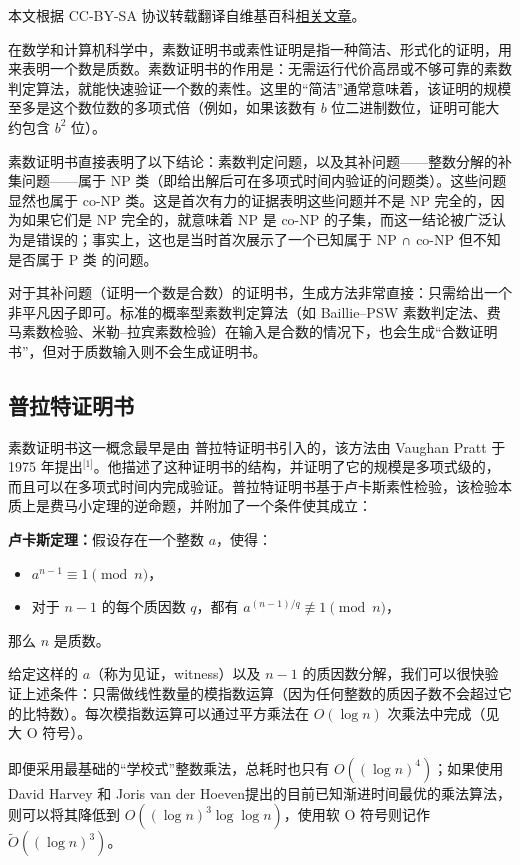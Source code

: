 
本文根据 CC-BY-SA 协议转载翻译自维基百科\href{https://en.wikipedia.org/wiki/Primality_certificate}{相关文章}。

在数学和计算机科学中，素数证明书或素性证明是指一种简洁、形式化的证明，用来表明一个数是质数。素数证明书的作用是：无需运行代价高昂或不够可靠的素数判定算法，就能快速验证一个数的素性。这里的“简洁”通常意味着，该证明的规模至多是这个数位数的多项式倍（例如，如果该数有 $b$ 位二进制数位，证明可能大约包含 $b^2$ 位）。

素数证明书直接表明了以下结论：素数判定问题，以及其补问题——整数分解的补集问题——属于 NP 类（即给出解后可在多项式时间内验证的问题类）。这些问题显然也属于 co-NP 类。这是首次有力的证据表明这些问题并不是 NP 完全的，因为如果它们是 NP 完全的，就意味着 NP 是 co-NP 的子集，而这一结论被广泛认为是错误的；事实上，这也是当时首次展示了一个已知属于 NP ∩ co-NP 但不知是否属于 P 类 的问题。

对于其补问题（证明一个数是合数）的证明书，生成方法非常直接：只需给出一个非平凡因子即可。标准的概率型素数判定算法（如 Baillie–PSW 素数判定法、费马素数检验、米勒–拉宾素数检验）在输入是合数的情况下，也会生成“合数证明书”，但对于质数输入则不会生成证明书。
\subsection{普拉特证明书}
素数证明书这一概念最早是由 普拉特证明书引入的，该方法由 Vaughan Pratt 于 1975 年提出\(^\text{[1]}\)。他描述了这种证明书的结构，并证明了它的规模是多项式级的，而且可以在多项式时间内完成验证。普拉特证明书基于卢卡斯素性检验，该检验本质上是费马小定理的逆命题，并附加了一个条件使其成立：

\textbf{卢卡斯定理：}假设存在一个整数 $a$，使得：
\begin{itemize}
\item $a^{n - 1} \equiv 1 \pmod{n}$，
\item 对于 $n - 1$ 的每个质因数 $q$，都有 $a^{(n - 1) / q} \not\equiv 1 \pmod{n}$，
\end{itemize}
那么 $n$ 是质数。

给定这样的 $a$（称为见证，witness）以及 $n - 1$ 的质因数分解，我们可以很快验证上述条件：只需做线性数量的模指数运算（因为任何整数的质因子数不会超过它的比特数）。每次模指数运算可以通过平方乘法在 $O(\log n)$ 次乘法中完成（见大 O 符号）。

即便采用最基础的“学校式”整数乘法，总耗时也只有 $O((\log n)^{4})$；如果使用 David Harvey 和 Joris van der Hoeven提出的目前已知渐进时间最优的乘法算法，则可以将其降低到 $O((\log n)^{3} \log\log n)$，使用软 O 符号则记作 $\tilde{O}((\log n)^{3})$。

